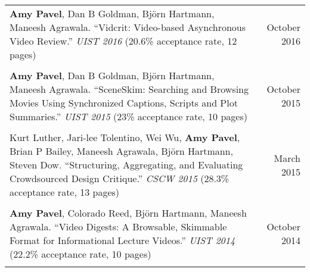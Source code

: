 \begin{longtable}{Xr}
	\textbf{Amy Pavel}, Dan B Goldman, Björn Hartmann, Maneesh Agrawala. ``Vidcrit: Video-based Asynchronous Video Review.'' \textit{UIST 2016} (20.6\% acceptance rate, 12 pages) & October 2016 \\
	\\

	\textbf{Amy Pavel}, Dan B Goldman, Björn Hartmann, Maneesh Agrawala. ``SceneSkim: Searching and Browsing Movies Using Synchronized Captions, Scripts and Plot Summaries.'' \textit{UIST 2015} (23\% acceptance rate, 10 pages) & October 2015 \\
	\\

	Kurt Luther, Jari-lee Tolentino, Wei Wu, \textbf{Amy Pavel}, Brian P Bailey, Maneesh Agrawala, Björn Hartmann, Steven Dow. ``Structuring, Aggregating, and Evaluating Crowdsourced Design Critique.'' \textit{CSCW 2015} (28.3\% acceptance rate, 13 pages) & March 2015 \\
	\\

	\textbf{Amy Pavel}, Colorado Reed, Björn Hartmann, Maneesh Agrawala. ``Video Digests: A Browsable, Skimmable Format for Informational Lecture Videos.'' \textit{UIST 2014} (22.2\% acceptance rate, 10 pages) & October 2014 \\
	\\

\end{longtable}